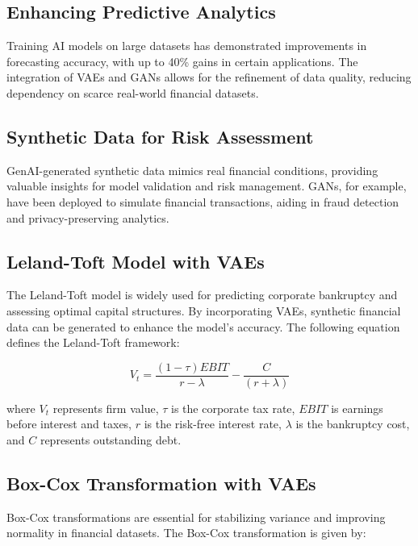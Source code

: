 \documentclass[a4paper,12pt]{scrbook}
\begin{document}
	
	\subsection{Enhancing Predictive Analytics}
	Training AI models on large datasets has demonstrated improvements in forecasting accuracy, with up to 40\% gains in certain applications. The integration of VAEs and GANs allows for the refinement of data quality, reducing dependency on scarce real-world financial datasets.
	
	\subsection{Synthetic Data for Risk Assessment}
	GenAI-generated synthetic data mimics real financial conditions, providing valuable insights for model validation and risk management. GANs, for example, have been deployed to simulate financial transactions, aiding in fraud detection and privacy-preserving analytics.
	
	
	\subsection{Leland-Toft Model with VAEs}
	The Leland-Toft model is widely used for predicting corporate bankruptcy and assessing optimal capital structures. By incorporating VAEs, synthetic financial data can be generated to enhance the model’s accuracy. The following equation defines the Leland-Toft framework:
	
	\begin{equation}
		V_t = \frac{(1 - \tau) EBIT}{r - \lambda} - \frac{C}{(r + \lambda)}
	\end{equation}
	
	where $V_t$ represents firm value, $\tau$ is the corporate tax rate, $EBIT$ is earnings before interest and taxes, $r$ is the risk-free interest rate, $\lambda$ is the bankruptcy cost, and $C$ represents outstanding debt.
	
	\subsection{Box-Cox Transformation with VAEs}
	Box-Cox transformations are essential for stabilizing variance and improving normality in financial datasets. The Box-Cox transformation is given by:
	
\end{document}
